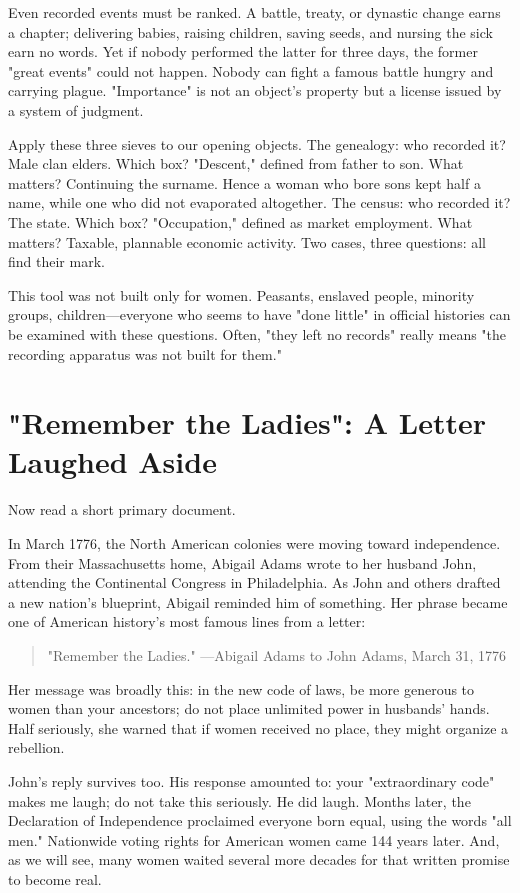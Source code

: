 Even recorded events must be ranked. A battle, treaty, or dynastic change earns a chapter; delivering babies, raising children, saving seeds, and nursing the sick earn no words. Yet if nobody performed the latter for three days, the former "great events" could not happen. Nobody can fight a famous battle hungry and carrying plague. "Importance" is not an object's property but a license issued by a system of judgment.

Apply these three sieves to our opening objects. The genealogy: who recorded it? Male clan elders. Which box? "Descent," defined from father to son. What matters? Continuing the surname. Hence a woman who bore sons kept half a name, while one who did not evaporated altogether. The census: who recorded it? The state. Which box? "Occupation," defined as market employment. What matters? Taxable, plannable economic activity. Two cases, three questions: all find their mark.

This tool was not built only for women. Peasants, enslaved people, minority groups, children---everyone who seems to have "done little" in official histories can be examined with these questions. Often, "they left no records" really means "the recording apparatus was not built for them."

\section{"Remember the Ladies": A Letter Laughed Aside}
Now read a short primary document.

In March 1776, the North American colonies were moving toward independence. From their Massachusetts home, Abigail Adams wrote to her husband John, attending the Continental Congress in Philadelphia. As John and others drafted a new nation's blueprint, Abigail reminded him of something. Her phrase became one of American history's most famous lines from a letter:

\begin{quote}
"Remember the Ladies." ---Abigail Adams to John Adams, March 31, 1776
\end{quote}
Her message was broadly this: in the new code of laws, be more generous to women than your ancestors; do not place unlimited power in husbands' hands. Half seriously, she warned that if women received no place, they might organize a rebellion.

John's reply survives too. His response amounted to: your "extraordinary code" makes me laugh; do not take this seriously. He did laugh. Months later, the Declaration of Independence proclaimed everyone born equal, using the words "all men." Nationwide voting rights for American women came 144 years later. And, as we will see, many women waited several more decades for that written promise to become real.

